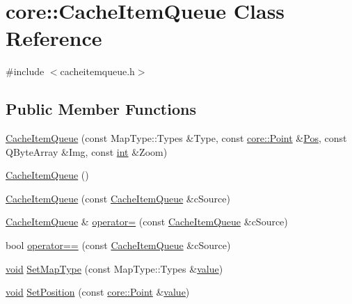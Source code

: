 \hypertarget{classcore_1_1_cache_item_queue}{\section{core\-:\-:Cache\-Item\-Queue Class Reference}
\label{classcore_1_1_cache_item_queue}
}


{\ttfamily \#include $<$cacheitemqueue.\-h$>$}

\subsection*{Public Member Functions}
\begin{DoxyCompactItemize}
\item 
\hyperlink{group___o_p_map_widget_gadc9b31f39de2abe3de6041258d92a7bd}{Cache\-Item\-Queue} (const Map\-Type\-::\-Types \&Type, const \hyperlink{structcore_1_1_point}{core\-::\-Point} \&\hyperlink{deflate_8h_a80a8610ae675eaeead82013bacde10a1}{Pos}, const Q\-Byte\-Array \&Img, const \hyperlink{ioapi_8h_a787fa3cf048117ba7123753c1e74fcd6}{int} \&Zoom)
\item 
\hyperlink{group___o_p_map_widget_ga51cf399db0ddbbef8d48f8f8e420f373}{Cache\-Item\-Queue} ()
\item 
\hyperlink{group___o_p_map_widget_ga3dce0468e367c4fc113ecf651b691a9f}{Cache\-Item\-Queue} (const \hyperlink{classcore_1_1_cache_item_queue}{Cache\-Item\-Queue} \&c\-Source)
\item 
\hyperlink{classcore_1_1_cache_item_queue}{Cache\-Item\-Queue} \& \hyperlink{group___o_p_map_widget_gae7e315a2dbbb005c92e8d39d4e189d75}{operator=} (const \hyperlink{classcore_1_1_cache_item_queue}{Cache\-Item\-Queue} \&c\-Source)
\item 
bool \hyperlink{group___o_p_map_widget_ga18cc75c132d29a3dde534259ffe74e0e}{operator==} (const \hyperlink{classcore_1_1_cache_item_queue}{Cache\-Item\-Queue} \&c\-Source)
\item 
\hyperlink{group___u_a_v_objects_plugin_ga444cf2ff3f0ecbe028adce838d373f5c}{void} \hyperlink{group___o_p_map_widget_ga182224d6a020047e69c16ce20adb25bd}{Set\-Map\-Type} (const Map\-Type\-::\-Types \&\hyperlink{glext_8h_aa0e2e9cea7f208d28acda0480144beb0}{value})
\item 
\hyperlink{group___u_a_v_objects_plugin_ga444cf2ff3f0ecbe028adce838d373f5c}{void} \hyperlink{group___o_p_map_widget_ga085e1a1de0ae2d6b9d8c6786f922c6a7}{Set\-Position} (const \hyperlink{structcore_1_1_point}{core\-::\-Point} \&\hyperlink{glext_8h_aa0e2e9cea7f208d28acda0480144beb0}{value})

\end{DoxyCompactItemize}
